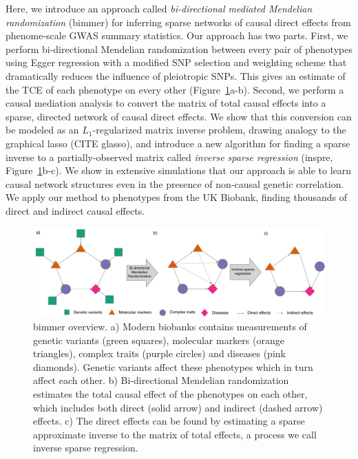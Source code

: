 \documentclass{article}
\begin{document}
Here, we introduce an approach called
\emph{bi-directional mediated Mendelian randomization} (bimmer)
for inferring sparse networks of causal direct effects from phenome-scale
GWAS summary statistics.
Our approach has two parts. First, we perform bi-directional Mendelian randomization
between every pair of phenotypes using Egger regression with a
modified SNP selection and weighting scheme that dramatically reduces the
influence of pleiotropic SNPs.
This gives an estimate of the TCE of each phenotype on every other (Figure~\ref{figure0}a-b).
Second,
we perform a causal mediation analysis to convert the matrix
of total causal effects into a sparse, directed network of causal direct effects.
We show that this conversion can be modeled as an $L_1$-regularized matrix inverse problem,
drawing analogy to the graphical lasso (CITE glasso), and introduce a new
algorithm for finding a sparse inverse to a partially-observed matrix called
\emph{inverse sparse regression} (inspre, Figure~\ref{figure0}b-c).
We show in extensive simulations that our approach is able to learn causal
 network structures even in the presence of non-causal genetic correlation.
We apply our method to  phenotypes from the UK Biobank, finding thousands
 of direct and indirect causal effects.
 
\begin{figure}\label{figure0}
\includegraphics[width=\textwidth]{figures/bimmer_figure1.pdf}
\caption{bimmer overview. a) Modern biobanks contains measurements of genetic variants (green squares), molecular markers
(orange triangles), complex traits (purple circles) and diseases (pink diamonds). Genetic variants
affect these phenotypes which in turn affect each other. b) Bi-directional Mendelian randomization
estimates the total causal effect of the phenotypes on each other, which includes both
direct (solid arrow) and indirect (dashed arrow) effects. c) The direct effects can be
found by estimating a sparse approximate inverse to the matrix of total effects, a process we
call inverse sparse regression.}
\end{figure}
\end{document}
